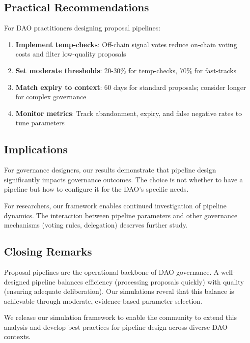 \subsection{Practical Recommendations}

For DAO practitioners designing proposal pipelines:

\begin{enumerate}
    \item \textbf{Implement temp-checks}: Off-chain signal votes reduce on-chain voting costs and filter low-quality proposals
    \item \textbf{Set moderate thresholds}: 20-30\% for temp-checks, 70\% for fast-tracks
    \item \textbf{Match expiry to context}: 60 days for standard proposals; consider longer for complex governance
    \item \textbf{Monitor metrics}: Track abandonment, expiry, and false negative rates to tune parameters
\end{enumerate}

\subsection{Implications}

For governance designers, our results demonstrate that pipeline design significantly impacts governance outcomes. The choice is not whether to have a pipeline but how to configure it for the DAO's specific needs.

For researchers, our framework enables continued investigation of pipeline dynamics. The interaction between pipeline parameters and other governance mechanisms (voting rules, delegation) deserves further study.

\subsection{Closing Remarks}

Proposal pipelines are the operational backbone of DAO governance. A well-designed pipeline balances efficiency (processing proposals quickly) with quality (ensuring adequate deliberation). Our simulations reveal that this balance is achievable through moderate, evidence-based parameter selection.

We release our simulation framework to enable the community to extend this analysis and develop best practices for pipeline design across diverse DAO contexts.
